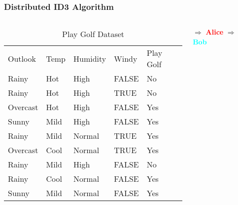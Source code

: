 \documentclass[xcolor=table]{beamer}
\newcommand{\red}[1]{\textcolor{red}{#1}}
\newcommand{\cyan}[1]{\textcolor{cyan}{#1}}
\begin{document}
\begin{frame}
\frametitle{Distributed ID3 Algorithm}
\begin{columns}

\begin{column}{8cm}
\begin{table}[]
\centering
\caption{Play Golf Dataset}
\begin{tabular}{lllll}
\rowcolor[HTML]{9B9B9B} 
Outlook  & Temp & Humidity & Windy & Play Golf \\
\rowcolor[HTML]{FFCB2F} 
Rainy    & Hot  & High     & FALSE & No        \\
\rowcolor[HTML]{FFCB2F} 
Rainy    & Hot  & High     & TRUE  & No        \\
\rowcolor[HTML]{FFCB2F} 
Overcast & Hot  & High     & FALSE & Yes       \\
\rowcolor[HTML]{FFCB2F} 
Sunny    & Mild & High     & FALSE & Yes       \\
\rowcolor[HTML]{FFCB2F} 
Rainy    & Mild & Normal   & TRUE  & Yes       \\
\rowcolor[HTML]{34CDF9} 
Overcast & Cool & Normal   & TRUE  & Yes       \\
\rowcolor[HTML]{34CDF9} 
Rainy    & Mild & High     & FALSE & No        \\
\rowcolor[HTML]{34CDF9} 
Rainy    & Cool & Normal   & FALSE & Yes       \\
\rowcolor[HTML]{34CDF9} 
Sunny    & Mild & Normal   & FALSE & Yes      
\end{tabular}
\end{table}
\end{column}



\begin{column}{2cm}
\vspace{2cm} \newline
{\large $\Rightarrow$} \hspace{4mm} \red{\bf Alice} \newline
\vspace{1cm} \newline
{\large $\Rightarrow$} \hspace{4mm} \cyan{\bf Bob}
\end{column}

\end{columns}

\end{frame}
\end{document}

